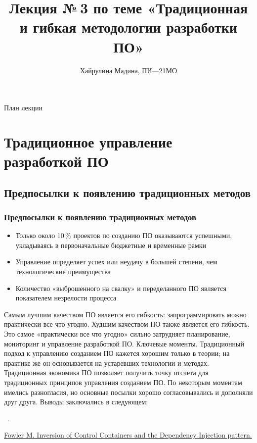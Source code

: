 \documentclass{../industrial-development}
\title{Лекция №\,3 по теме «Традиционная и гибкая методологии разработки ПО»}
\author{Хайрулина Мадина, ПИ---21МО}
\date{}
\begin{document}
\begin{frame}
  \titlepage
\end{frame}

\begin{frame}{План лекции}
  \tableofcontents
\end{frame}

\section{Традиционное управление разработкой ПО}
\subsection{Предпосылки к появлению традиционных методов}

\begin{frame} \frametitle{Предпосылки к появлению традиционных методов}
	\begin{itemize}
	\item Только около 10\,\% проектов по созданию ПО оказываются успешными, укладываясь в первоначальные бюджетные и временные рамки
	\item Управление определяет успех или неудачу в большей степени, чем технологические преимущества
	\item Количество «выброшенного на свалку» и переделанного ПО является показателем незрелости процесса
	\end{itemize}
\end{frame}

\lecturenotes
Самым лучшим качеством ПО является его гибкость: запрограммировать можно практически все что угодно. Худшим качеством ПО также является его гибкость. Это самое «практически все что угодно» сильно затрудняет планирование, мониторинг и управление разработкой ПО. Ключевые моменты. Традиционный подход к управлению созданием ПО кажется хорошим только в теории; на практике же он основывается на устаревших технологии и методах. Традиционная экономика ПО позволяет получить точку отсчета для традиционных принципов управления созданием ПО. По некоторым моментам имелись разногласия, но основные посылки хорошо согласовывались и дополняли друг друга. Выводы заключались в следующем: 

~\cite{Fowler}.
\begin{thebibliography}{99}
 \href{https://project.dovidnyk.info/index.php/programnye-proekty/upravlenieproektamiposozdaniyuprogrammnogoobespecheniya/66-tradicionnoe_upravlenie_razrabotkoj_po}{Fowler M. Inversion of Control Containers and the Dependency Injection pattern.}
\end{thebibliography}
\end{document}
